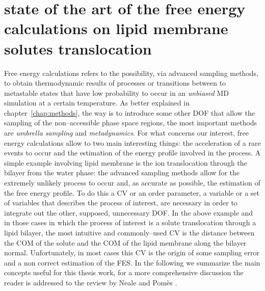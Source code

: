 \section{state of the art of the free energy calculations on lipid membrane solutes translocation}
Free energy calculations refers to the possibility, via advanced sampling methods, to obtain thermodynamic results of processes or transitions between to metastable states that have low probability to occur in an \textit{unbiased} \ac{MD} simulation at a certain temperature. As better explained in chapter~\ref{chap:methods}, the way is to introduce some other \ac{DOF} that allow the sampling of the non--accessible phase space regions, the most important methods are \textit{umbrella sampling} and \textit{metadynamics}. For what concerns our interest, free energy calculations allow to two main interesting things: the acceleration of a rare events to occur and the estimation of the energy profile involved in the process. A simple example involving lipid membrane is the ion translocation through the bilayer from the water phase: the advanced sampling methods allow for the extremely unlikely process to occur and, as accurate as possible, the estimation of the free energy profile. To do this a \ac{CV} or an order parameter, a variable or a set of variables that describes the process of interest, are necessary in order to integrate out the other, supposed, unnecessary \ac{DOF}. In the above example and in those cases in which the process of interest is a solute translocation through a lipid bilayer, the most intuitive and commonly--used \ac{CV} is the distance between the \ac{COM} of the solute and the \ac{COM} of the lipid membrane along the bilayer normal. Unfortunately, in most cases this \ac{CV} is the origin of some sampling error and a non correct estimation of the \ac{FES}. In the following we summarize the main concepts useful for this thesis work, for a more comprehensive discussion the reader is addressed to the review by Neale and Pomès \cite{Neale2016}.

